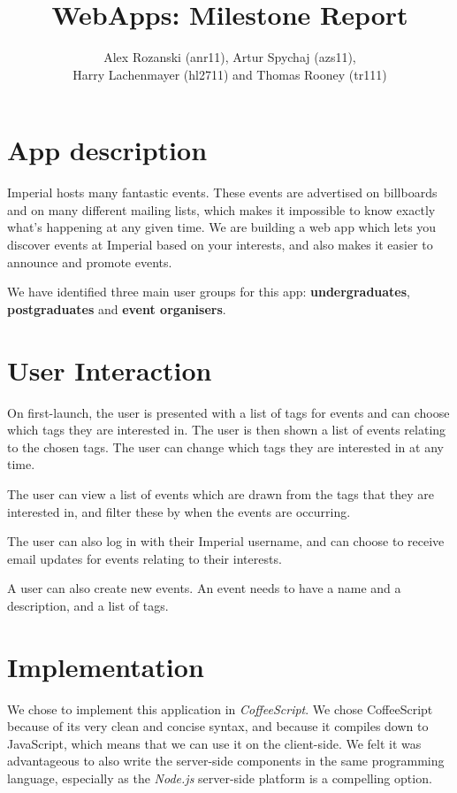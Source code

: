 \documentclass[a4wide, 11pt]{article}
\begin{document}
\title{WebApps: Milestone Report}
\author{Alex Rozanski (anr11), Artur Spychaj (azs11),\\ Harry Lachenmayer (hl2711) and Thomas Rooney (tr111)}

\maketitle

\section*{App description}

Imperial hosts many fantastic events. These events are advertised on billboards and on many different mailing lists, which makes it impossible to know exactly what's happening at any given time. We are building a web app which lets you discover events at Imperial based on your interests, and also makes it easier to announce and promote events.

We have identified three main user groups for this app: \textbf{undergraduates}, \textbf{postgraduates} and \textbf{event organisers}.

\section*{User Interaction}

On first-launch, the user is presented with a list of tags for events and can choose which tags they are interested in. The user is then shown a list of events relating to the chosen tags. The user can change which tags they are interested in at any time.

The user can view a list of events which are drawn from the tags that they are interested in, and filter these by when the events are occurring.

The user can also log in with their Imperial username, and can choose to receive email updates for events relating to their interests.

A user can also create new events. An event needs to have a name and a description, and a list of tags.

\newpage

\section*{Implementation}

We chose to implement this application in \textit{CoffeeScript}. We chose CoffeeScript because of its very clean and concise syntax, and because it compiles down to JavaScript, which means that we can use it on the client-side. We felt it was advantageous to also write the server-side components in the same programming language, especially as the \textit{Node.js} server-side platform is a compelling option.
\end{document}
